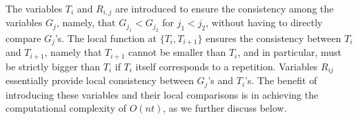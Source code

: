 {The variables $T_i$ and $R_{i,j}$ are introduced to ensure the
consistency among the variables $G_j$, namely, that $G_{j_1} <
G_{j_2}$ for $j_1< j_2$, without having to directly compare $G_j$'s.
The local function at $\{T_i,T_{i+1}\}$ ensures the consistency
between $T_i$ and $T_{i+1}$, namely that $T_{i+1}$ cannot be smaller
than $T_{i}$, and in particular, must be strictly bigger than $T_i$
if $T_i$ itself corresponds to a repetition. Variables $R_{ij}$
essentially provide local consistency between $G_j$'s and $T_i$'s.
The benefit of introducing these variables and their local
comparisons is in achieving the computational complexity of $O(nt)$,
as we further discuss below.

}
